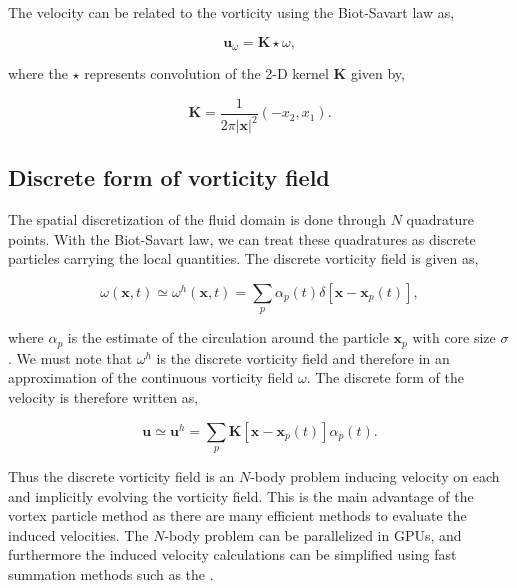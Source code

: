 The velocity can be related to the vorticity using the Biot-Savart law as,

	\begin{equation}
	\mathbf{u}_{\omega} = \mathbf{K}\star\omega,
	\end{equation}
	
where the $\star$ represents convolution of the 2-D kernel $\mathbf{K}$ given by,

	\begin{equation}
	\mathbf{K} = \frac{1}{2\pi\left|\mathbf{x}\right|^2}\left(-x_2,x_1\right).
	\label{eq:GreensKernel}
	\end{equation}
	
\subsection{Discrete form of vorticity field}
The spatial discretization of the fluid domain is done through $N$ quadrature points. With the Biot-Savart law, we can treat these quadratures as discrete particles carrying the local quantities. The discrete vorticity field is given as,

	\begin{equation}
	\omega\left(\mathbf{x},t\right) \simeq \omega^h\left(\mathbf{x},t\right) = \sum_{p}\alpha_p\left(t\right)\delta \left[\mathbf{x}-\mathbf{x}_p\left(t\right)\right],
	\end{equation}

where $\alpha_{p}$ is the estimate of the circulation around the particle $\mathbf{x}_p$ with core size $\sigma$. We must note that $\omega^h$ is the discrete vorticity field and therefore in an approximation of the continuous vorticity field $\omega$. The discrete form of the velocity is therefore written as,

	\begin{equation}
	\mathbf{u} \simeq \mathbf{u}^h = \sum_p \mathbf{K}\left[\mathbf{x}-\mathbf{x}_p\left(t\right)\right]\alpha_p\left(t\right).
	\end{equation}
	
Thus the discrete vorticity field is an $N$-body problem inducing velocity on each and implicitly evolving the vorticity field. This is the main advantage of the vortex particle method as there are many efficient methods to evaluate the induced velocities. The $N$-body problem can be parallelized in GPUs, and furthermore the induced velocity calculations can be simplified using fast summation methods such as the .
	
